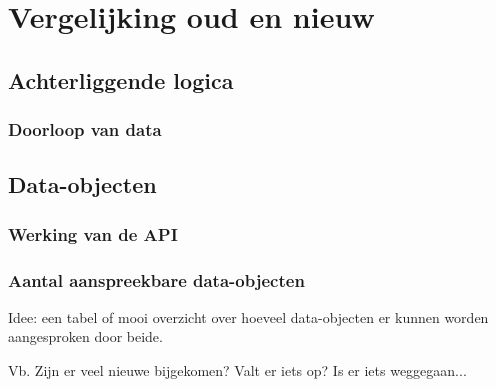 
\chapter{Vergelijking oud en nieuw}%
\label{ch:vergelijking}

\section{Achterliggende logica}


\subsection{Doorloop van data}



\section{Data-objecten}

\subsection{Werking van de API}



\subsection{Aantal aanspreekbare data-objecten}

Idee: een tabel of mooi overzicht over hoeveel data-objecten er kunnen worden aangesproken door beide.

Vb. Zijn er veel nieuwe bijgekomen? Valt er iets op? Is er iets weggegaan...



